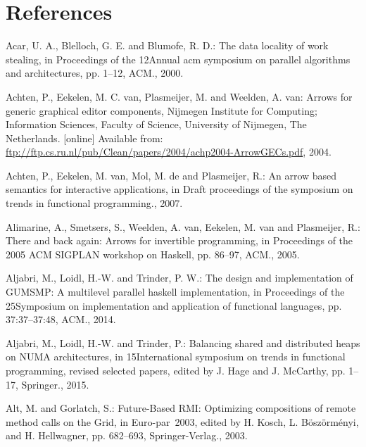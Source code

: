 \documentclass[paper=A4,twoside=true,openright,parskip=full,chapterprefix=true,headings=normal,bibliography=totoc,listof=totoc,titlepage=on,captions=tableabove,draft=false,british]{scrreprt}%
\begin{document}
\hypertarget{references}{%
\chapter*{References}\label{references}}

\hypertarget{refs}{}
\leavevmode\hypertarget{ref-Acar:2000:DLW:341800.341801}{}%
Acar, U. A., Blelloch, G. E. and Blumofe, R. D.: The data locality of
work stealing, in Proceedings of the 12Annual acm symposium on parallel
algorithms and architectures, pp. 1--12, ACM., 2000.

\leavevmode\hypertarget{ref-achten2004arrows}{}%
Achten, P., Eekelen, M. C. van, Plasmeijer, M. and Weelden, A. van:
Arrows for generic graphical editor components, Nijmegen Institute for
Computing; Information Sciences, Faculty of Science, University of
Nijmegen, The Netherlands. {[}online{]} Available from:
\url{ftp://ftp.cs.ru.nl/pub/Clean/papers/2004/achp2004-ArrowGECs.pdf},
2004.

\leavevmode\hypertarget{ref-achten2007arrow}{}%
Achten, P., Eekelen, M. van, Mol, M. de and Plasmeijer, R.: An arrow
based semantics for interactive applications, in Draft proceedings of
the symposium on trends in functional programming., 2007.

\leavevmode\hypertarget{ref-Alimarine:2005:BAA:1088348.1088357}{}%
Alimarine, A., Smetsers, S., Weelden, A. van, Eekelen, M. van and
Plasmeijer, R.: There and back again: Arrows for invertible programming,
in Proceedings of the 2005 ACM SIGPLAN workshop on Haskell, pp. 86--97,
ACM., 2005.

\leavevmode\hypertarget{ref-Aljabri:2013:DIG:2620678.2620682}{}%
Aljabri, M., Loidl, H.-W. and Trinder, P. W.: The design and
implementation of GUMSMP: A multilevel parallel haskell implementation,
in Proceedings of the 25Symposium on implementation and application of
functional languages, pp. 37:37--37:48, ACM., 2014.

\leavevmode\hypertarget{ref-Aljabri2015}{}%
Aljabri, M., Loidl, H.-W. and Trinder, P.: Balancing shared and
distributed heaps on NUMA architectures, in 15International symposium on
trends in functional programming, revised selected papers, edited by J.
Hage and J. McCarthy, pp. 1--17, Springer., 2015.

\leavevmode\hypertarget{ref-AlGo03a}{}%
Alt, M. and Gorlatch, S.: Future-Based RMI: Optimizing compositions of
remote method calls on the Grid, in Euro-par~2003, edited by H. Kosch,
L. Böszörményi, and H. Hellwagner, pp. 682--693, Springer-Verlag., 2003.
\end{document}
